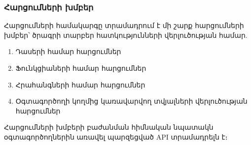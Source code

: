 {
    \subsubsection{Հարցումների խմբեր}\label{subsubsec:queryGroups}
    Հարցումների համակարգը տրամադրում է մի շարք հարցումների խմբեր՝ ծրագրի տարբեր հատկությունների վերլուծության համար.
    \begin{enumerate}
        \item Դասերի համար հարցումներ
        \item Ֆունկցիաների համար հարցումներ
        \item Հրահանգների համար հարցումներ
        \item Օգտագործողի կողմից կառավարվող տվյալների վերլուծության հարցումներ
    \end{enumerate}

    Հարցումների խմբերի բաժանման հիմնական նպատակն օգտագործողներին առավել պարզեցված API տրամադրելն է։

    

    

    

    
}